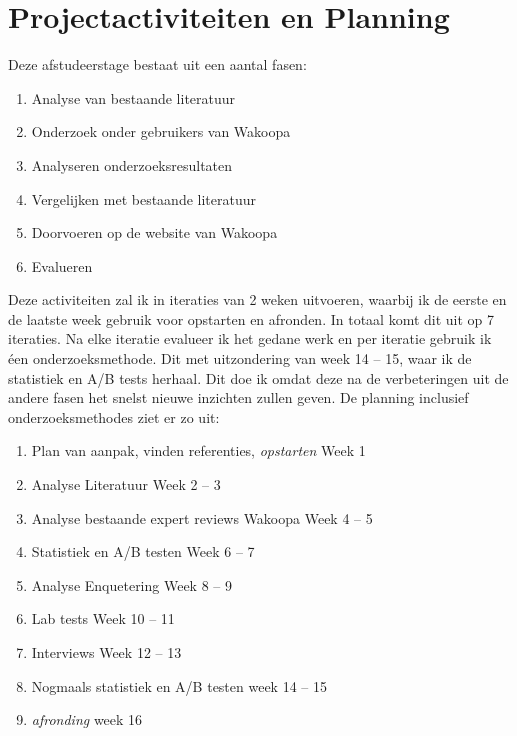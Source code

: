 \documentclass[a4paper, 10pt, pdftex]{article}
\begin{document}
\section{Projectactiviteiten en Planning}
Deze afstudeerstage bestaat uit een aantal fasen:

\begin{enumerate}
\item
Analyse van bestaande literatuur
\item
Onderzoek onder gebruikers van Wakoopa
\item
Analyseren onderzoeksresultaten
\item
Vergelijken met bestaande literatuur
\item
Doorvoeren op de website van Wakoopa
\item
Evalueren
\end{enumerate}

Deze activiteiten zal ik in iteraties van 2 weken uitvoeren, waarbij ik de eerste en de laatste week gebruik voor opstarten en afronden. In totaal komt dit uit op 7 iteraties. Na elke iteratie evalueer ik het gedane werk en per iteratie gebruik ik éen onderzoeksmethode. Dit met uitzondering van week 14 -- 15, waar ik de statistiek en A/B tests herhaal. Dit doe ik omdat deze na de verbeteringen uit de andere fasen het snelst nieuwe inzichten zullen geven. De planning inclusief onderzoeksmethodes ziet er zo uit:

\begin{flushleft}
  \begin{enumerate}
    \item Plan van aanpak, vinden referenties, \emph{opstarten}
      \linebreak Week 1
    \item Analyse Literatuur
      \linebreak Week 2 -- 3
    \item Analyse bestaande expert reviews Wakoopa
      \linebreak Week 4 -- 5
    \item Statistiek en A/B testen
      \linebreak Week 6 -- 7
    \item Analyse Enquetering
      \linebreak Week 8 -- 9
    \item Lab tests
      \linebreak Week 10 -- 11
    \item Interviews
      \linebreak Week 12 -- 13
    \item Nogmaals statistiek en A/B testen
      \linebreak week 14 -- 15
    \item \emph{afronding}
      \linebreak week 16
  \end{enumerate}
\end{flushleft}
\end{document}
